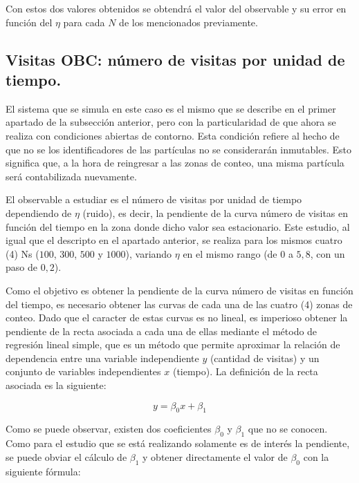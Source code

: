 \documentclass[11pt, a4paper]{article}
\begin{document}
            Con estos dos valores obtenidos se obtendrá el valor del observable y su error en función del $\eta$ para cada $N$ de los mencionados previamente.

        \subsection{Visitas OBC: número de visitas por unidad de tiempo.}
        \label{subsec:visitas-obc}

            El sistema que se simula en este caso es el mismo que se describe en el primer apartado de la subsección
            anterior, pero con la particularidad de que ahora se realiza con condiciones abiertas de contorno.
            Esta condición refiere al hecho de que no se los identificadores de las partículas no se considerarán inmutables.
            Esto significa que, a la hora de reingresar a las zonas de conteo, una misma partícula será contabilizada nuevamente.

            El observable a estudiar es el número de visitas por unidad de tiempo dependiendo de $\eta$ (ruido), es decir,
            la pendiente de la curva número de visitas en función del tiempo en la zona donde dicho valor sea estacionario.
            Este estudio, al igual que el descripto en el apartado anterior, se realiza para los mismos cuatro (4) Ns
            ($100$, $300$, $500$ y $1000$), variando $\eta$ en el mismo rango (de $0$ a $5,8$, con un paso de $0,2$).

            Como el objetivo es obtener la pendiente de la curva número de visitas en función del tiempo, es necesario obtener las curvas
            de cada una de las cuatro (4) zonas de conteo.
            Dado que el caracter de estas curvas es no lineal, es imperioso obtener la pendiente de la recta asociada
            a cada una de ellas mediante el método de regresión lineal simple, que es un método que permite aproximar
            la relación de dependencia entre una variable independiente $y$ (cantidad de visitas) y un conjunto de
            variables independientes $x$ (tiempo).
            La definición de la recta asociada es la siguiente:

            \begin{equation}
                y = \beta_0 x + \beta_1
            \end{equation}

            Como se puede observar, existen dos coeficientes $\beta_0$ y $\beta_1$ que no se conocen.
            Como para el estudio que se está realizando solamente es de interés la pendiente, se puede obviar el cálculo
            de $\beta_1$ y obtener directamente el valor de $\beta_0$ con la siguiente fórmula:
\end{document}
